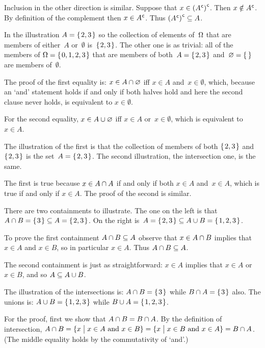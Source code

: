 \documentclass{test}  %
\begin{document}
\begin{problem}
\begin{answer}
\begin{items}
  Inclusion in the other direction is similar.
  Suppose that $x\in{({A}^{\mspace{1mu}\mathsf{c}})}^{\mspace{1mu}\mathsf{c}}$.
  Then $x\notin{A}^{\mspace{1mu}\mathsf{c}}$.
  By definition of the complement then $x\in{A}^{\mspace{1mu}\mathsf{c}}$.
  Thus ${({A}^{\mspace{1mu}\mathsf{c}})}^{\mspace{1mu}\mathsf{c}}\subseteq A$. 
\item In the illustration $A=\mbox{$\{\hspace{0.1em}2,3\hspace{0.1em}\}$}$ so the collection of
  elements of~$\Omega$ that are members of either~$A$ or~$\emptyset$
  is~$\mbox{$\{\hspace{0.1em}2,3\hspace{0.1em}\}$}$.
  The other one is as trivial: all of the members of 
  $\Omega=\mbox{$\{\hspace{0.1em}0,1,2,3\hspace{0.1em}\}$}$ that are members of both~$A=\mbox{$\{\hspace{0.1em}2,3\hspace{0.1em}\}$}$
  and~$\emptyset=\set{}$ are members of~$\emptyset$.

  The proof of the first equality is: $x\in A\cap\varnothing$
  iff $x\in A$ and~$x\in\emptyset$, 
  which, because an `and' statement holds if and only if both halves hold
  and here the second clause never holds,
  is equivalent to $x\in\emptyset$. 

  For the second equality, 
  $x\in A\cup\varnothing$ iff $x\in A$ or~$x\in\emptyset$,
  which is equivalent to $x\in A$.
\item The illustration of the first is that the collection of members of both
  $\mbox{$\{\hspace{0.1em}2,3\hspace{0.1em}\}$}$ and~$\mbox{$\{\hspace{0.1em}2,3\hspace{0.1em}\}$}$ is the set~$A=\mbox{$\{\hspace{0.1em}2,3\hspace{0.1em}\}$}$.
  The second illustration, the intersection one, is the same.

  The first is true because
  $x\in A\cap A$ if and only if
  both $x\in A$ and~$x\in A$, 
  which is true if and only if $x\in A$.
  The proof of the second is similar.
\item There are two containments to illustrate.
  The one on the left is that $A\cap B=\mbox{$\{\hspace{0.1em}3\hspace{0.1em}\}$}\subseteq A=\mbox{$\{\hspace{0.1em}2,3\hspace{0.1em}\}$}$.
  On the right is~$A=\mbox{$\{\hspace{0.1em}2,3\hspace{0.1em}\}$}\subseteq A\cup B=\mbox{$\{\hspace{0.1em}1,2,3\hspace{0.1em}\}$}$.

  To prove the first containment $A\cap B\subseteq A$ observe that 
  $x\in A\cap B$ implies that
  $x\in A$ and $x\in B$, so in particular $x\in A$.
  Thus $A\cap B\subseteq A$.

  The second containment is just as straightforward:
  $x\in A$ implies that $x\in A$ or~$x\in B$, and so $A\subseteq A\cup B$.
\item The illustration of the intersections is: $A\cap B=\mbox{$\{\hspace{0.1em}3\hspace{0.1em}\}$}$
  while $B\cap A=\mbox{$\{\hspace{0.1em}3\hspace{0.1em}\}$}$ also.
  The unions is: $A\cup B=\mbox{$\{\hspace{0.1em}1,2,3\hspace{0.1em}\}$}$ while $B\cup A=\mbox{$\{\hspace{0.1em}1,2,3\hspace{0.1em}\}$}$.

  For the proof, first we show that
  $A\cap B=B\cap A$.
  By the definition of intersection,  
  $A\cap B=\{x \bigm| \text{$x\in A$ and $x\in B$}\}
    =\{x \bigm| \text{$x\in B$ and $x\in A$}\}=B\cap A$.
  (The middle equality holds by the commutativity of `and'.)


\end{items}
\end{answer}
\end{problem}
\end{document}

